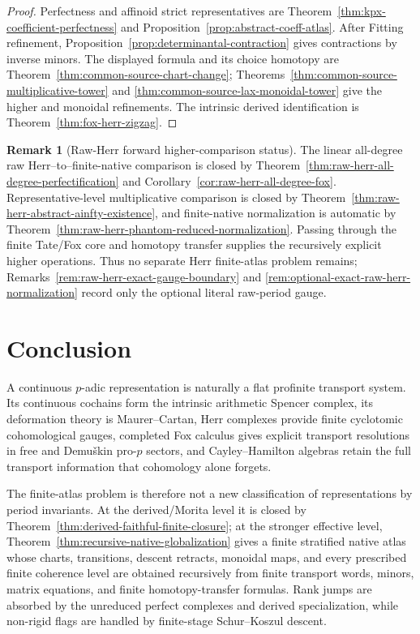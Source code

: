 \documentclass[11pt]{article}
\theoremstyle{definition}
\newtheorem{remark}[theorem]{Remark}
\begin{document}
\begin{proof}
Perfectness and affinoid strict representatives are Theorem~\ref{thm:kpx-coefficient-perfectness} and Proposition~\ref{prop:abstract-coeff-atlas}.  After Fitting refinement, Proposition~\ref{prop:determinantal-contraction} gives contractions by inverse minors.  The displayed formula and its choice homotopy are Theorem~\ref{thm:common-source-chart-change}; Theorems~\ref{thm:common-source-multiplicative-tower} and \ref{thm:common-source-lax-monoidal-tower} give the higher and monoidal refinements.  The intrinsic derived identification is Theorem~\ref{thm:fox-herr-zigzag}.
\end{proof}

\begin{remark}[Raw-Herr forward higher-comparison status]\label{rem:herr-finite-atlas-status}
The linear all-degree raw Herr--to--finite-native comparison is closed by Theorem~\ref{thm:raw-herr-all-degree-perfectification} and Corollary~\ref{cor:raw-herr-all-degree-fox}.  Representative-level multiplicative comparison is closed by Theorem~\ref{thm:raw-herr-abstract-ainfty-existence}, and finite-native normalization is automatic by Theorem~\ref{thm:raw-herr-phantom-reduced-normalization}.  Passing through the finite Tate/Fox core and homotopy transfer supplies the recursively explicit higher operations.  Thus no separate Herr finite-atlas problem remains; Remarks~\ref{rem:raw-herr-exact-gauge-boundary} and \ref{rem:optional-exact-raw-herr-normalization} record only the optional literal raw-period gauge.
\end{remark}

\section{Conclusion}

A continuous $p$-adic representation is naturally a flat profinite transport system.  Its continuous cochains form the intrinsic arithmetic Spencer complex, its deformation theory is Maurer--Cartan, Herr complexes provide finite cyclotomic cohomological gauges, completed Fox calculus gives explicit transport resolutions in free and Demu\v{s}kin pro-$p$ sectors, and Cayley--Hamilton algebras retain the full transport information that cohomology alone forgets.

The finite-atlas problem is therefore not a new classification of representations by period invariants.  At the derived/Morita level it is closed by Theorem~\ref{thm:derived-faithful-finite-closure}; at the stronger effective level, Theorem~\ref{thm:recursive-native-globalization} gives a finite stratified native atlas whose charts, transitions, descent retracts, monoidal maps, and every prescribed finite coherence level are obtained recursively from finite transport words, minors, matrix equations, and finite homotopy-transfer formulas.  Rank jumps are absorbed by the unreduced perfect complexes and derived specialization, while non-rigid flags are handled by finite-stage Schur--Koszul descent.
\end{document}

